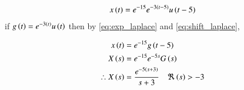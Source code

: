 \documentclass[journal,12pt,twocolumn]{IEEEtran}
\theoremstyle{remark}
\begin{document}
\solution

\begin{align}
    x\left(t\right) = e^{-15}e^{-3\left(t - 5\right)}u\left(t - 5\right)
\end{align}
if $g\left(t\right) = e^{-3\left(t\right)}u\left(t\right)$ then by \eqref{eq:exp_laplace} and \eqref{eq:shift_laplace},

\begin{align}
    x\left(t\right) &= e^{-15}g\left(t - 5\right) \\
    X\left(s\right) &= e^{-15}e^{-5s}G\left(s\right)\\
    \therefore X\left(s\right) &= \frac{e^{-5\left(s + 3\right)}}{s + 3} \quad \Re\left(s\right) > -3
\end{align}

\begin{table}[ht]

\end{table}
\end{document}

